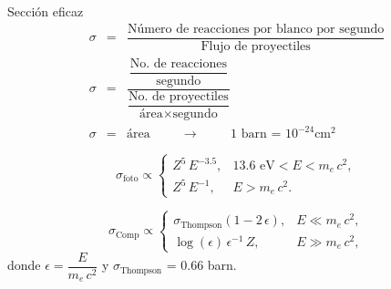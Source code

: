 \documentclass[9pt]{beamer}
\begin{document}
\begin{frame}[noframenumbering, label=SeccionEficaz]{Sección eficaz}
\begin{eqnarray}
\sigma &=& \dfrac{\text{Número de reacciones por blanco por segundo}}{\text{Flujo de proyectiles}} \\
\sigma&=& \dfrac{\dfrac{\text{No. de reacciones}}{\text{segundo}}}{\dfrac{\text{No. de proyectiles}}{\text{área}\times\text{segundo}}} \\
\sigma&=& \text{área} \hspace{1cm} \rightarrow \hspace{1cm} \text{1 barn = }10^{-24} \text{cm}^2
\end{eqnarray}

\begin{equation}
\sigma_{\text{foto}} \propto  
  \begin{cases}
    Z^5\, E^{-3.5},	& 13.6 \text{ eV} < E<m_e\,c^2, \\
    Z^5\, E^{-1},	& E > m_e\,c^2.
  \end{cases}
\end{equation}

\begin{equation}
\sigma_\text{Comp} \propto
  \begin{cases}
    \sigma_{\text{Thompson}}(1-2\,\epsilon),	& E \ll m_e\,c^2, \\
    \log(\epsilon)\, \epsilon^{-1} \,Z,		&  E \gg m_e\,c^2,
  \end{cases}
\end{equation}
donde $\epsilon = \dfrac{E}{m_e\,c^2}$ y $\sigma_{\text{Thompson}}$ = 0.66 barn.
	\begin{flushright}
	\hyperlink{Portada}{}
	\end{flushright}
\end{frame}
\end{document}
